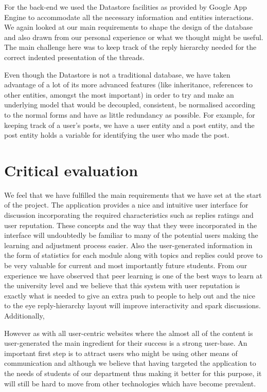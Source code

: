 \documentclass[12pt,a4paper,titlepage]{article}
\begin{document}
For the back-end we used the Datastore facilities as provided by Google App Engine to accommodate all the necessary information and entities interactions. We again looked at our main requirements to shape the design of the database and also drawn from our personal experience or what we thought might be useful. The main challenge here was to keep track of the reply hierarchy needed for the correct indented presentation of the threads. 

Even though the Datastore is not a traditional database, we have taken advantage of a lot of its more advanced features (like inheritance, references to other entities, amongst the most important) in order to try and make an underlying model that would be decoupled, consistent, be normalised according to the normal forms and have as little redundancy as possible. For example, for keeping track of a user's posts, we have a user entity and a post entity, and the post entity holds a variable for  identifying the user who made the post.
\newpage

\section{Critical evaluation}
We feel that we have fulfilled the main requirements that we have set at the start of the project. The application provides a nice and intuitive user interface for discussion incorporating the required characteristics such as replies ratings and user reputation. These concepts and the way that they were incorporated in the interface will undoubtedly be familiar to many of the potential users making the learning and adjustment process easier. Also the user-generated information in the form of statistics for each module along with topics and replies could prove to be very valuable for current and most importantly future students. From our experience we have observed that peer learning is one of the best ways to learn at the university level and we believe that this system with user reputation is exactly what is needed to give an extra push to people to help out and the nice to the eye reply-hierarchy layout will improve interactivity and spark discussions. Additionally, 

However as with all user-centric websites where the almost all of the content is user-generated the main ingredient for their success is a strong user-base. An important first step is to attract users who might be using other means of communication and although we believe that having targeted the application to the needs of students of our department thus making it better for this purpose, it will still be hard to move from other technologies which have become prevalent. 
\end{document}

